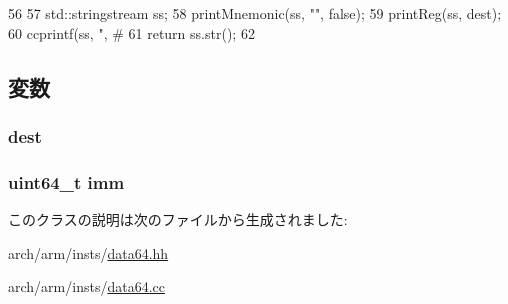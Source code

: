 \begin{DoxyCode}
56 {
57     std::stringstream ss;
58     printMnemonic(ss, "", false);
59     printReg(ss, dest);
60     ccprintf(ss, ", #%
61     return ss.str();
62 }
\end{DoxyCode}


\subsection{変数}
\hypertarget{classArmISA_1_1DataXImmOnlyOp_aec72e8e45bdc87abeeeb75d2a8a9a716}{
\subsubsection[{dest}]{ {\bf dest}}}
\label{classArmISA_1_1DataXImmOnlyOp_aec72e8e45bdc87abeeeb75d2a8a9a716}
\hypertarget{classArmISA_1_1DataXImmOnlyOp_a2b4406ad2843b5aa12d244d01d8fdc69}{
\subsubsection[{imm}]{\setlength{\rightskip}{0pt plus 5cm}uint64\_\-t {\bf imm}}}
\label{classArmISA_1_1DataXImmOnlyOp_a2b4406ad2843b5aa12d244d01d8fdc69}


このクラスの説明は次のファイルから生成されました:\begin{DoxyCompactItemize}
\item 
arch/arm/insts/\hyperlink{data64_8hh}{data64.hh}\item 
arch/arm/insts/\hyperlink{data64_8cc}{data64.cc}\end{DoxyCompactItemize}
